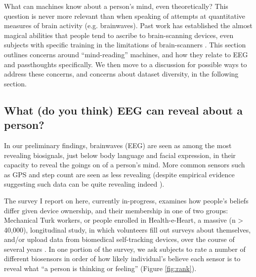 \documentclass[sigconf]{acmart}
\begin{document}
What can machines know about a person's mind, even theoretically? 
This question is never more relevant than when speaking of attempts at quantitative measures of brain activity (e.g. brainwaves).
Past work has established the almost magical abilities that people tend to ascribe to brain-scanning devices, even subjects with specific training in the limitations of brain-scanners \cite{Ali2014a}.
This section outlines concerns around ``mind-reading'' machines, and how they relate to EEG and passthoughts specifically.
We then move to a discussion for possible ways to address these concerns, and concerns about dataset diversity, in the following section.

\subsection{What (do you think) EEG can reveal about a person?}
\label{sec:orgad4f714}

In our preliminary findings, brainwaves (EEG) are seen as among the most revealing biosignals, just below body language and facial expression, in their capacity to reveal the goings on of a person's mind. 
More common sensors such as GPS and step count are seen as less revealing (despite empirical evidence suggesting such data can be quite revealing indeed \cite{Canzian2015}).

The survey I report on here, currently in-progress, examines how people's beliefs differ given device ownership, and their membership in one of two groups: Mechanical Turk workers, or people enrolled in Health-e-Heart, a massive (n > 40,000), longitudinal study, in which volunteers fill out surveys about themselves, and/or upload data from biomedical self-tracking devices, over the course of several years \cite{Estrin2010a}.
In one portion of the survey, we ask subjects to rate a number of different biosensors in order of how likely individual's believe each sensor is to reveal what ``a person is thinking or feeling'' (Figure \ref{fig:rank}).
\end{document}
